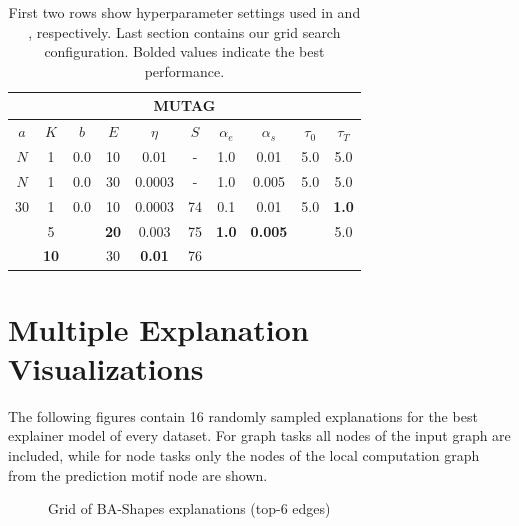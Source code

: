 \begin{table}[h]
  \centering
  \scriptsize
  \begin{tabular}{|c|c|c|c|c|c|c|c|c|c|}
  \hline
  \multicolumn{10}{|c|}{\textbf{MUTAG}} \\ \hline
  $a$ & $K$ & $b$ & $E$ & $\eta$ & $S$ & $\alpha_e$ & $\alpha_s$ & $\tau_0$ & $\tau_T$ \\ \hline
  $N$ & 1 & 0.0 & 10 & 0.01 & - & 1.0 & 0.01 & 5.0 & 5.0 \\ \hline
  $N$ & 1 & 0.0 & 30 & 0.0003 & - & 1.0 & 0.005 & 5.0 & 5.0 \\ \midrule
  30 & 1 & 0.0 & 10 & 0.0003 & 74 & 0.1 & 0.01 & 5.0 & \textbf{1.0} \\
   & 5 &  & \textbf{20} & 0.003 & 75 & \textbf{1.0} & \textbf{0.005} &  & 5.0 \\
   & \textbf{10} &  & 30 & \textbf{0.01} & 76 &  &  &  &  \\ \hline
  \end{tabular}
  \caption[MUTAG Grid Search]{First two rows show hyperparameter settings used in \cite{luo2020parameterized} and \cite{holdijk2021re}, respectively. Last section contains our grid search configuration. Bolded values indicate the best performance.}
\end{table}

\clearpage
\section{Multiple Explanation Visualizations}
\label{sec:grid_vis}
The following figures contain 16 randomly sampled explanations for the best explainer model of every dataset. For graph tasks all nodes of the input graph are included, while for node tasks only the nodes of the local computation graph from the prediction motif node are shown.

\begin{figure}[htbp]
    \centering
    \caption{Grid of BA-Shapes explanations (top-6 edges)}
    \label{fig:grid-BA-Shapes-explanations}
\end{figure}

